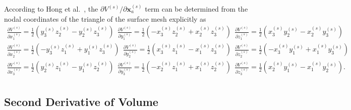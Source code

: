 According to Hong et al.\ \cite{Hong:2006vz}, the $\partial V^{(s)}/\partial \pmb{x}_a^{(s)}$ term can be determined from the nodal coordinates of the triangle of the surface mesh explicitly as
%
\begin{eqnarray}
\frac{\partial V^{(s)}}{\partial x^{(s)}_1} = \frac{1}{2} \left(y^{(s)}_3 z^{(s)}_2 - y^{(s)}_2 z^{(s)}_3 \right) \ \
\frac{\partial V^{(s)}}{\partial y^{(s)}_1} = \frac{1}{2} \left(-x^{(s)}_3 z^{(s)}_2 + x^{(s)}_2 z^{(s)}_3 \right) \ \
\frac{\partial V^{(s)}}{\partial z^{(s)}_1} = \frac{1}{2} \left(x^{(s)}_3 y^{(s)}_2 - x^{(s)}_2 y^{(s)}_3 \right) \nonumber\\
\frac{\partial V^{(s)}}{\partial x^{(s)}_2} = \frac{1}{2} \left(-y^{(s)}_3 z^{(s)}_1 + y^{(s)}_1 z^{(s)}_3 \right) \ \
\frac{\partial V^{(s)}}{\partial y^{(s)}_2} = \frac{1}{2} \left(x^{(s)}_3 z^{(s)}_1 - x^{(s)}_1 z^{(s)}_3 \right) \ \
\frac{\partial V^{(s)}}{\partial z^{(s)}_2} = \frac{1}{2} \left(-x^{(s)}_3 y^{(s)}_1 + x^{(s)}_1 y^{(s)}_3 \right) \nonumber\\
\frac{\partial V^{(s)}}{\partial x^{(s)}_3} = \frac{1}{2} \left(y^{(s)}_2 z^{(s)}_1 - y^{(s)}_1 z^{(s)}_2 \right) \ \
\frac{\partial V^{(s)}}{\partial y^{(s)}_3} = \frac{1}{2} \left(-x^{(s)}_2 z^{(s)}_1 + x^{(s)}_1 z^{(s)}_2 \right) \ \
\frac{\partial V^{(s)}}{\partial z^{(s)}_3} = \frac{1}{2} \left(x^{(s)}_2 y^{(s)}_1 - x^{(s)}_1 y^{(s)}_2 \right). \nonumber\\
\label{eq:dVdu_explicit}
\end{eqnarray}
%

\subsection{Second Derivative of Volume}


